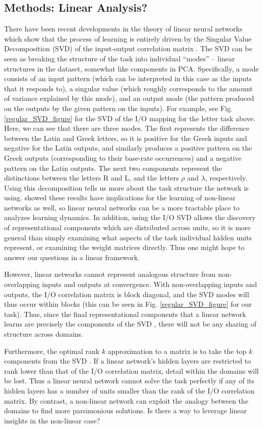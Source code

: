 \documentclass[10pt,letterpaper]{article}
\begin{document}
\subsection{Methods: Linear Analysis?}
There have been recent developments in the theory of linear neural networks which show that the process of learning is entirely driven by the Singular Value Decomposition (SVD) of the input-output correlation matrix \citep{Saxe2013}. The SVD can be seen as breaking the structure of the task into individual ``modes'' -- linear structures in the dataset, somewhat like components in PCA. Specifically, a mode consists of an input pattern (which can be interpreted in this case as the inputs that it responds to), a singular value (which roughly corresponds to the amount of variance explained by this mode), and an output mode (the pattern produced on the outputs by the given pattern on the inputs). For example, see Fig. \ref{regular_SVD_figure} for the SVD of the I/O mapping for the letter task above. Here, we can see that there are three modes. The first represents the difference between the Latin and Greek letters, so it is positive for the Greek inputs and negative for the Latin outputs, and similarly produces a positive pattern on the Greek outputs (corresponding to their base-rate occurrences) and a negative pattern on the Latin outputs. The next two components represent the distinctions between the letters R and L, and the letters \(\rho\) and \(\lambda\), respectively. Using this decomposition tells us more about the task structure the network is using. \citet{Saxe2013} showed these results have implications for the learning of non-linear networks as well, so linear neural networks can be a more tractable place to analyzee learning dynamics. In addition, using the I/O SVD allows the discovery of representational components which are distributed across units, so it is more general than simply examining what aspects of the task individual hidden units represent, or examining the weight matrices directly. Thus one might hope to answer our questions in a linear framework. \par
However, linear networks cannot represent analogous structure from non-overlapping inputs and outputs at convergence. With non-overlapping inputs and outputs, the I/O correlation matrix is block diagonal, and the SVD modes will thus occur within blocks (this can be seen in Fig. \ref{regular_SVD_figure} for our task). Thus, since the final representational components that a linear network learns are precisely the components of the SVD \citep{Saxe2013}, there will not be any sharing of structure across domains.\par 
Furthermore, the optimal rank $k$ approximation to a matrix is to take the top $k$ components from the SVD \citep{Mirsky1960}. If a linear network's hidden layers are restricted to rank lower than that of the I/O correlation matrix, detail within the domains will be lost. Thus a linear neural network cannot solve the task perfectly if any of its hidden layers has a number of units smaller than the rank of the I/O correlation matrix. By contrast, a non-linear network can exploit the analogy between the domains to find more parsimonious solutions. Is there a way to leverage linear insights in the non-linear case?  
\end{document}
